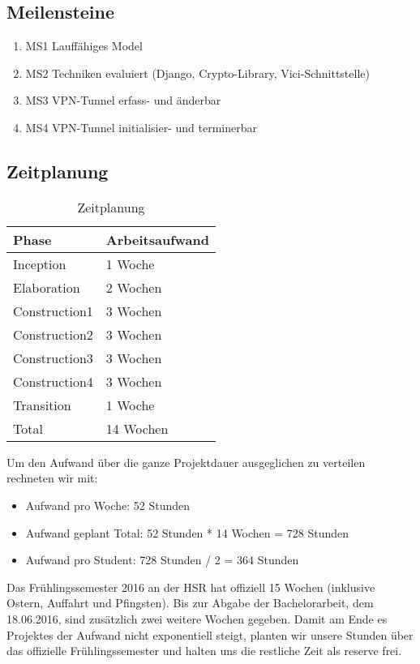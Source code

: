 \newpage

\subsection{Meilensteine}
\begin{enumerate}
	\item MS1 Lauffähiges Model
	\item MS2 Techniken evaluiert (Django, Crypto-Library, Vici-Schnittstelle)
	\item MS3 VPN-Tunnel erfass- und änderbar
	\item MS4 VPN-Tunnel initialisier- und terminerbar
\end{enumerate}

\subsection{Zeitplanung}

\begin{table}[H]
	\centering
    \begin{tabular}{|p{6cm}|p{6cm}|}
    \hline    
    \rowcolor{lightblue}
	Phase & Arbeitsaufwand \\ \hline   
	Inception & 1 Woche \\ \hline
	Elaboration & 2 Wochen \\ \hline
	Construction1 & 3 Wochen \\ \hline
	Construction2 & 3 Wochen \\ \hline
	Construction3 & 3 Wochen \\ \hline
	Construction4 & 3 Wochen \\ \hline
	Transition & 1 Woche \\ \hline
	\rowcolor{lightblue}
	Total & 14 Wochen \\ \hline
    \end{tabular}
    \caption[Zeitplanung]{Zeitplanung}
\end{table}
\medskip
Um den Aufwand über die ganze Projektdauer ausgeglichen zu verteilen rechneten wir mit:
\begin{itemize}
    \item Aufwand pro Woche: 52 Stunden
    \item Aufwand geplant Total: 52 Stunden * 14 Wochen = 728 Stunden
    \item Aufwand pro Student: 728 Stunden / 2 = 364 Stunden
\end{itemize}

Das Frühlingssemester 2016 an der HSR hat offiziell 15 Wochen  (inklusive Ostern, Auffahrt und Pfingsten). Bis zur Abgabe der Bachelorarbeit, dem 18.06.2016, sind zusätzlich zwei weitere Wochen gegeben. Damit am Ende es Projektes der Aufwand nicht exponentiell steigt, planten wir unsere Stunden über das offizielle Frühlingssemester und halten uns die restliche Zeit als reserve frei.


